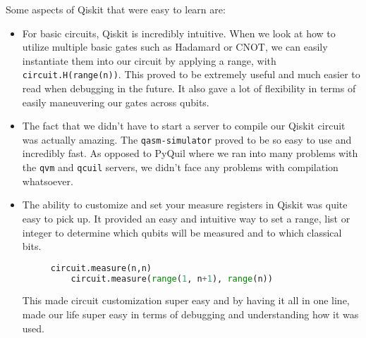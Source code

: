 \documentclass[12pt]{article}
\begin{document}
Some aspects of Qiskit that were easy to learn are:
\begin{itemize}
    \item For basic circuits, Qiskit is incredibly intuitive. When we look at how to utilize multiple basic gates such as Hadamard or CNOT, we can easily instantiate them into our circuit by applying a range, with \texttt{circuit.H(range(n))}.
This proved to be extremely useful and much easier to read when debugging in the future. It also gave a lot of flexibility in terms of easily maneuvering our gates across qubits.
\item The fact that we didn’t have to start a server to compile our Qiskit circuit was actually amazing. The \texttt{qasm-simulator} proved to be so easy to use and incredibly fast. As opposed to PyQuil where we ran into many problems with the \texttt{qvm} and \texttt{qcuil} servers, we didn’t face any problems with compilation whatsoever.
\item The ability to customize and set your measure registers in Qiskit was quite easy to pick up. It provided an easy and intuitive way to set a range, list or integer to determine which qubits will be measured and to which classical bits.

\begin{figure}[h]
    \centering
    \begin{lstlisting}[numbers=none, language=Python]
    circuit.measure(n,n)
    circuit.measure(range(1, n+1), range(n))
\end{lstlisting}
\end{figure}
This made circuit customization super easy and by having it all in one line, made our life super easy in terms of debugging and understanding how it was used.
\end{itemize}
\end{document}
